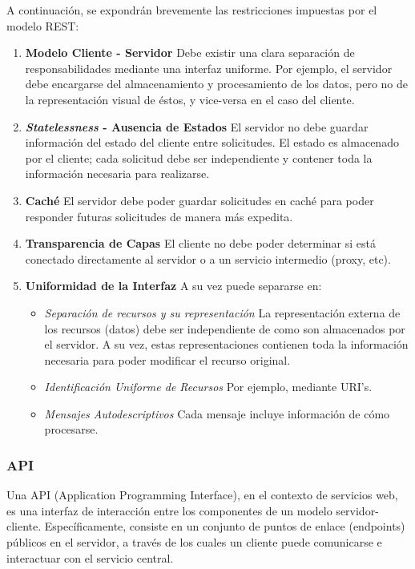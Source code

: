 \documentclass[11pt,letterpaper]{article}
\begin{document}
A continuación, se expondrán brevemente las restricciones impuestas por el modelo REST:
\begin{enumerate}
    \item \textbf{Modelo Cliente - Servidor} \@ Debe existir una clara separación de responsabilidades mediante una interfaz uniforme. Por ejemplo, el servidor debe encargarse del almacenamiento y procesamiento de los datos, pero no de la representación visual de éstos, y vice-versa en el caso del cliente.
    \item \textbf{\textit{Statelessness} - Ausencia de Estados} \@ El servidor no debe guardar información del estado del cliente entre solicitudes. El estado es almacenado por el cliente; cada solicitud debe ser independiente y contener toda la información necesaria para realizarse.
    \item \textbf{Caché} \@ El servidor debe poder guardar solicitudes en caché para poder responder futuras solicitudes de manera más expedita.
    \item \textbf{Transparencia de Capas} \@ El cliente no debe poder determinar si está conectado directamente al servidor o a un servicio intermedio (proxy, etc).
    \item \textbf{Uniformidad de la Interfaz} \@ A su vez puede separarse en:
    \begin{itemize}
        \item \emph{Separación de recursos y su representación} \@ La representación externa de los recursos (datos) debe ser independiente de como son almacenados por el servidor. A su vez, estas representaciones contienen toda la información necesaria para poder modificar el recurso original.
        \item \emph{Identificación Uniforme de Recursos} \@ Por ejemplo, mediante URI's\cite{uri}.
        \item \emph{Mensajes Autodescriptivos} \@ Cada mensaje incluye información de cómo procesarse.
    \end{itemize}
\end{enumerate}

\subsubsection{API}

Una API (Application Programming Interface), en el contexto de servicios web, es una interfaz de interacción entre los componentes de un modelo servidor-cliente. Específicamente, consiste en un conjunto de puntos de enlace (endpoints) públicos en el servidor, a través de los cuales un cliente puede comunicarse e interactuar con el servicio central.
\end{document}
